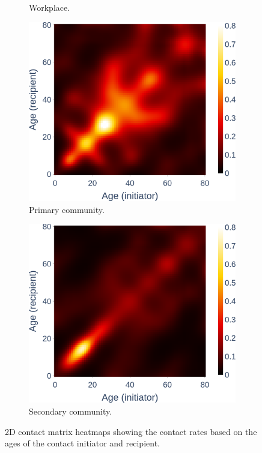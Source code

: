 \begin{figure}
\begin{subfigure}[b]{0.45\linewidth}
    \caption{Workplace.} 
    \label{fig:workplace_contact_heatmap} 
    \vspace{4ex}
  \end{subfigure}
  \begin{subfigure}[b]{0.45\linewidth}
    \centering
    \includegraphics[width=\linewidth]{3 - Stride/fig/primary_contact_heatmap.png} 
    \caption{Primary community.} 
    \label{fig:primary_contact_heatmap} 
  \end{subfigure}%
  \hfill
  \begin{subfigure}[b]{0.45\linewidth}
    \centering
    \includegraphics[width=\linewidth]{3 - Stride/fig/secondary_contact_heatmap.png} 
    \caption{Secondary community.} 
    \label{fig:secondary_contact_heatmap} 
  \end{subfigure} 
  \caption{2D contact matrix heatmaps showing the contact rates based on the ages of the contact initiator and recipient.}
  \label{fig:contact_heatmaps} 
\end{figure}

